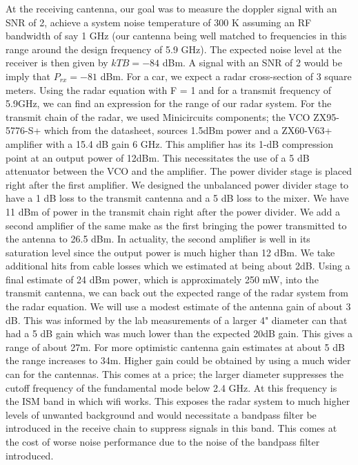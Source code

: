 \documentclass[reprint, aps, prl]{revtex4-1}
\begin{document}
At the receiving cantenna, our goal was to measure the doppler signal with an SNR of 2, achieve a system noise temperature of 300 K assuming an RF bandwidth of say 1 GHz (our cantenna being well matched to frequencies in this range around the design frequency of 5.9 GHz). The expected noise level at the receiver is then given by $k T B = -84$ dBm. A signal with an SNR of 2 would be imply that $P_{rx} = -81$ dBm. For a car, we expect a radar cross-section of  3 square meters. Using the radar equation with F = 1 and for a transmit frequency of 5.9GHz, we can find an expression for the range of our radar system. For the transmit chain of the radar, we used Minicircuits components; the VCO ZX95-5776-S+ which from the datasheet, sources 1.5dBm power and a ZX60-V63+ amplifier with a 15.4 dB gain 6 GHz. This amplifier has its 1-dB compression point at an output power of 12dBm. This necessitates the use of a 5 dB attenuator between the VCO and the amplifier. The power divider stage is placed right after the first amplifier. We designed the unbalanced power divider stage to have a 1 dB loss to the transmit cantenna and a 5 dB loss to the mixer. We have 11 dBm of power in the transmit chain right after the power divider. We add a second amplifier of the same make as the first bringing the power transmitted to the antenna to 26.5 dBm. In actuality, the second amplifier is well in its saturation level since the output power is much higher than 12 dBm. We take additional hits from cable losses which we estimated at being about 2dB. Using a final estimate of 24 dBm power, which is approximately 250 mW, into the transmit cantenna, we can back out the expected range of the radar system from the radar equation. We will use a modest estimate of the antenna gain of about 3 dB. This was informed by the lab measurements of a larger 4" diameter can that had a 5 dB gain which was much lower than the expected 20dB gain. This gives a range of about 27m. For more optimistic cantenna gain estimates at about 5 dB the range increases to 34m. Higher gain could be obtained by using a much wider can for the cantennas. This comes at a price; the larger diameter suppresses the cutoff frequency of the fundamental mode below 2.4 GHz. At this frequency is the ISM band in which wifi works. This exposes the radar system to much higher levels of unwanted background and would necessitate a bandpass filter be introduced in the receive chain to suppress signals in this band. This comes at the cost of worse noise performance due to the noise of the bandpass filter introduced.
\end{document}
